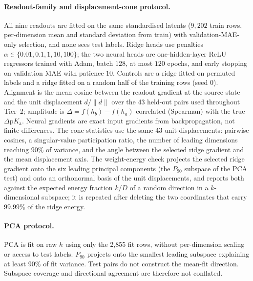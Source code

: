 \documentclass[11pt]{article}
\newcommand{\pka}{\mathrm{p}K_{\mathrm a}}
\begin{document}
\paragraph{Readout-family and displacement-cone protocol.}
\label{sec:readout_family_methods}
All nine readouts are fitted on the same standardised latents ($9{,}202$ train rows, per-dimension mean and standard deviation from train) with validation-MAE-only selection, and none sees test labels. Ridge heads use penalties $\alpha\in\{0.01,0.1,1,10,100\}$; the two neural heads are one-hidden-layer ReLU regressors trained with Adam, batch $128$, at most $120$ epochs, and early stopping on validation MAE with patience $10$. Controls are a ridge fitted on permuted labels and a ridge fitted on a random half of the training rows (seed $0$). Alignment is the mean cosine between the readout gradient at the source state and the unit displacement $d/\lVert d\rVert$ over the 43 held-out pairs used throughout Tier~2; amplitude is $\Delta=f(h_b)-f(h_a)$ correlated (Spearman) with the true $\Delta\pka$. Neural gradients are exact input gradients from backpropagation, not finite differences. The cone statistics use the same 43 unit displacements: pairwise cosines, a singular-value participation ratio, the number of leading dimensions reaching $90\%$ of variance, and the angle between the selected ridge gradient and the mean displacement axis. The weight-energy check projects the selected ridge gradient onto the six leading principal components (the $P_{90}$ subspace of the PCA test) and onto an orthonormal basis of the unit displacements, and reports both against the expected energy fraction $k/D$ of a random direction in a $k$-dimensional subspace; it is repeated after deleting the two coordinates that carry $99.99\%$ of the ridge energy.

\paragraph{PCA protocol.} PCA is fit on raw $h$ using only the 2{,}855 fit rows, without per-dimension scaling or access to test labels. $P_{90}$ projects onto the smallest leading subspace explaining at least 90\% of fit variance. Test pairs do not construct the mean-fit direction. Subspace coverage and directional agreement are therefore not conflated.
\label{sec:pca_protocol_appendix}
\end{document}
